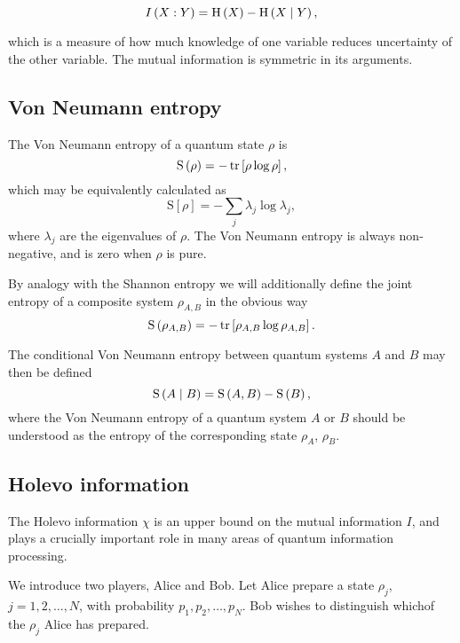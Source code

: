\begin{equation}\label{eqn:intro_mutual_information}
I\left(X : Y\right) = \text{H}\left(X\right) - \text{H}\left(X \; \middle| \; Y\right),
\end{equation}

\noindent which is a measure of how much knowledge of one variable reduces uncertainty of the other variable. The mutual information is symmetric in its arguments.


\FloatBarrier
\subsection{Von Neumann entropy}
The Von Neumann entropy of a quantum state $\rho$ is
\begin{equation}
\text{S}\left(\rho\right) = - \tr\left[\rho \log \rho \right],
\end{equation}
which may be equivalently calculated as
\begin{equation}
\text{S}\left[\rho\right] = - \sum_j \lambda_j \log \lambda_j,
\end{equation}
where $\lambda_j$ are the eigenvalues of $\rho$. The Von Neumann entropy is always non-negative, and is zero when $\rho$ is pure.

By analogy with the Shannon entropy we will additionally define the joint entropy of a composite system $\rho_{A, B}$ in the obvious way
\begin{equation}
\text{S}\left(\rho_{A, B}\right) = - \tr\left[\rho_{A, B} \log \rho_{A, B}\right].
\end{equation}

The conditional Von Neumann entropy between quantum systems $A$ and $B$ may then be defined
\begin{equation}
\text{S}\left(A \; \middle| \; B\right) = \text{S}\left(A, B\right) - \text{S}\left(B\right),
\end{equation}
where the Von Neumann entropy of a quantum system $A$ or $B$ should be understood as the entropy of the corresponding state $\rho_A$, $\rho_B$.


\FloatBarrier
\subsection{Holevo information}
The Holevo information $\chi$ is an upper bound on the mutual information $I$, and plays a crucially important role in many areas of quantum information processing. 

We introduce two players, Alice and Bob. Let Alice prepare a state $\rho_j$, $j = 1, 2, \dots, N$, with probability $p_1, p_2, \dots, p_N$. Bob wishes to distinguish whichof the $\rho_j$ Alice has prepared. 

